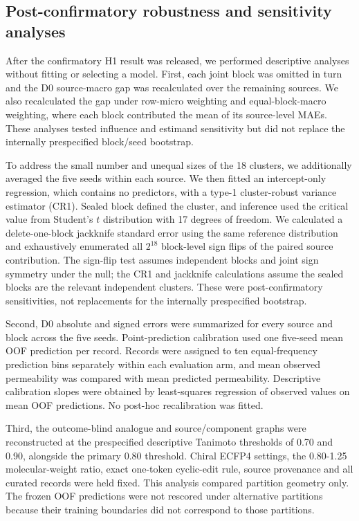 \documentclass[referee,lineno,pdflatex,sn-vancouver-num]{sn-jnl}
\begin{document}
\subsection{Post-confirmatory robustness and sensitivity analyses}

After the confirmatory H1 result was released, we performed descriptive analyses without fitting or selecting a model. First, each joint block was omitted in turn and the D0 source-macro gap was recalculated over the remaining sources. We also recalculated the gap under row-micro weighting and equal-block-macro weighting, where each block contributed the mean of its source-level MAEs. These analyses tested influence and estimand sensitivity but did not replace the internally prespecified block/seed bootstrap.

To address the small number and unequal sizes of the 18 clusters, we additionally averaged the five seeds within each source. We then fitted an intercept-only regression, which contains no predictors, with a type-1 cluster-robust variance estimator (CR1). Sealed block defined the cluster, and inference used the critical value from Student's $t$ distribution with 17 degrees of freedom. We calculated a delete-one-block jackknife standard error using the same reference distribution and exhaustively enumerated all $2^{18}$ block-level sign flips of the paired source contribution. The sign-flip test assumes independent blocks and joint sign symmetry under the null; the CR1 and jackknife calculations assume the sealed blocks are the relevant independent clusters. These were post-confirmatory sensitivities, not replacements for the internally prespecified bootstrap.

Second, D0 absolute and signed errors were summarized for every source and block across the five seeds. Point-prediction calibration used one five-seed mean OOF prediction per record. Records were assigned to ten equal-frequency prediction bins separately within each evaluation arm, and mean observed permeability was compared with mean predicted permeability. Descriptive calibration slopes were obtained by least-squares regression of observed values on mean OOF predictions. No post-hoc recalibration was fitted.

Third, the outcome-blind analogue and source/component graphs were reconstructed at the prespecified descriptive Tanimoto thresholds of 0.70 and 0.90, alongside the primary 0.80 threshold. Chiral ECFP4 settings, the 0.80-1.25 molecular-weight ratio, exact one-token cyclic-edit rule, source provenance and all curated records were held fixed. This analysis compared partition geometry only. The frozen OOF predictions were not rescored under alternative partitions because their training boundaries did not correspond to those partitions.
\end{document}
